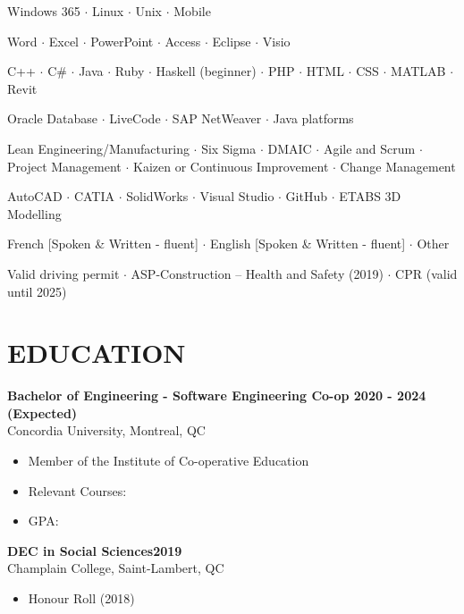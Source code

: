 \documentclass[a4paper,10pt]{article}
\begin{document}
\begin{description}
  \normalsize
    \item[\textbf{Operating Systems} \textbar{}] Windows 365 $\cdot$ Linux $\cdot$ Unix $\cdot$ Mobile
    \item[\textbf{Applications} \textbar{}] Word $\cdot$ Excel $\cdot$ PowerPoint $\cdot$ Access $\cdot$ Eclipse $\cdot$ Visio
    \item[\textbf{Programming} \textbar{}] C++ $\cdot$ C$\#$ $\cdot$ Java $\cdot$ Ruby $\cdot$ Haskell (beginner) $\cdot$ PHP $\cdot$ HTML $\cdot$ CSS $\cdot$ MATLAB $\cdot$ Revit
    \item[\textbf{Platforms} \textbar{}] Oracle Database $\cdot$ LiveCode $\cdot$ SAP NetWeaver $\cdot$ Java platforms
    \item[\textbf{Methodologies} \textbar{}] Lean Engineering/Manufacturing $\cdot$ Six Sigma $\cdot$ DMAIC $\cdot$ Agile and Scrum $\cdot$ Project Management \linebreak $\cdot$ Kaizen or Continuous Improvement $\cdot$ Change Management
    \item[\textbf{Other} \textbar{}] AutoCAD $\cdot$ CATIA $\cdot$ SolidWorks $\cdot$ Visual Studio $\cdot$ GitHub $\cdot$ ETABS 3D Modelling
    \item[\textbf{Languages} \textbar{}] French [Spoken \& Written - fluent] $\cdot$ English [Spoken \& Written - fluent] $\cdot$ Other
    \item[\textbf{Licenses \& Certifications} \textbar{}] Valid driving permit $\cdot$ ASP-Construction – Health and Safety (2019) $\cdot$ CPR (valid until 2025)
\end{description}

\section*{EDUCATION}

\textbf{Bachelor of Engineering - Software Engineering Co-op  \hfill 2020 - 2024 (Expected)} \\
Concordia University, Montreal, QC 
\vspace{-0.5em}
\begin{itemize}[noitemsep]
  \item Member of the Institute of Co-operative Education
  \item Relevant Courses: 
  \item GPA: 
\end{itemize}
\textbf{DEC in Social Sciences\hfill 2019 }  \\
Champlain College, Saint-Lambert, QC 
\vspace{-0.5em}
\begin{itemize}[noitemsep]
  \item Honour Roll (2018)
\end{itemize}
\end{document}
